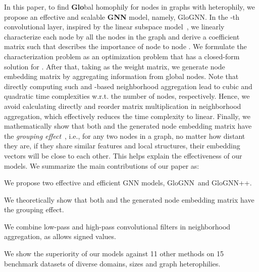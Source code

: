 \documentclass[nohyperref]{article}
\theoremstyle{plain}
\theoremstyle{definition}
\theoremstyle{remark}
\newcommand{\ada}{GloGNN}
\begin{document}
In this paper,
to find \textbf{Glo}bal homophily for nodes in graphs with heterophily,
we propose an effective and scalable \textbf{GNN} model, namely, {\ada}.
In the -th convolutional layer,
inspired by the linear subspace model~\cite{liu2012robust},
we linearly characterize each node by all the nodes in the graph and derive a coefficient matrix  
such that  describes the importance of node  to node .
We formulate the characterization problem as an optimization problem 
that has a closed-form solution for .
After that,
taking  as the weight matrix,
we generate node embedding matrix  by 
aggregating information from global nodes.
Note that
directly computing such  and -based neighborhood aggregation
lead to cubic and quadratic time complexities w.r.t. the number of nodes, respectively.
Hence, 
we avoid calculating  directly and reorder matrix multiplication in neighborhood aggregation,
which effectively reduces the time complexity to linear.
Finally,
we mathematically show that 
both  and the generated node embedding matrix  
have the \emph{grouping effect}~\cite{lu2012robust}, i.e., 
for any two nodes in a graph, no matter how distant they are,
if they share similar features and local structures,
their embedding vectors will be close to each other.
This helps explain the effectiveness of our models.
We summarize the main contributions of our paper as:












\noindent{\small}
We propose two effective and efficient GNN models, \ada\ and \ada++.




\noindent{\small}
We theoretically show that both  and the generated node embedding matrix 
have the {grouping effect}.


\noindent{\small}
We combine
low-pass and high-pass convolutional filters in neighborhood aggregation,
as  allows signed values.




\noindent{\small}
We show the superiority of our models against 11 other methods on 15 benchmark datasets of diverse domains, sizes and graph heterophilies.
\end{document}
